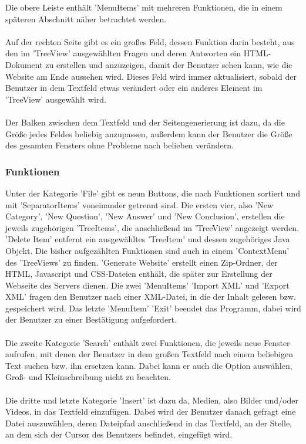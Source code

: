 Die obere Leiste enthält 'MenuItems' mit mehreren Funktionen, die in einem späteren Abschnitt näher betrachtet werden.
\\
\\
Auf der rechten Seite gibt es ein großes Feld, dessen Funktion darin besteht, aus den im 'TreeView' ausgewählten Fragen und deren Antworten ein HTML-Dokument zu erstellen und anzuzeigen, damit der Benutzer sehen kann, wie die Website am Ende aussehen wird. Dieses Feld wird immer aktualisiert, sobald der Benutzer in dem Textfeld etwas verändert oder ein anderes Element im 'TreeView' ausgewählt wird.
\\
\\
Der Balken zwischen dem Textfeld und der Seitengenerierung ist dazu, da die Größe jedes Feldes beliebig anzupassen, außerdem kann der Benutzer die Größe des gesamten Fensters ohne Probleme nach belieben verändern.

\subsubsection*{Funktionen}
Unter der Kategorie 'File' gibt es neun Buttons, die nach Funktionen sortiert und mit 'SeparatorItems' voneinander getrennt sind. Die ersten vier, also 'New Category', 'New Question', 'New Answer' und 'New Conclusion', erstellen die jeweils zugehörigen 'TreeItems', die anschließend im 'TreeView' angezeigt werden. 'Delete Item' entfernt ein ausgewähltes 'TreeItem' und dessen zugehöriges Java Objekt. Die bisher aufgezählten Funktionen sind auch in einem 'ContextMenu' des 'TreeViews' zu finden. 'Generate Website' erstellt einen Zip-Ordner, der HTML, Javascript und CSS-Dateien enthält, die später zur Erstellung der Webseite des Servers dienen. Die zwei 'MenuItems' 'Import XML' und 'Export XML' fragen den Benutzer nach einer XML-Datei, in die der Inhalt gelesen bzw. gespeichert wird. Das letzte 'MenuItem' 'Exit'  beendet das Programm, dabei wird der Benutzer zu einer Bestätigung aufgefordert.
\\
\\
Die zweite Kategorie 'Search' enthält zwei Funktionen, die jeweils neue Fenster aufrufen, mit denen der Benutzer in dem großen Textfeld nach einem beliebigen Text suchen bzw. ihn ersetzen kann. Dabei kann er auch die Option auswählen, Groß- und Kleinschreibung nicht zu beachten. 
\\
\\
Die dritte und letzte Kategorie 'Insert' ist dazu da, Medien, also Bilder und/oder Videos, in das Textfeld einzufügen. Dabei wird der Benutzer danach gefragt eine Datei auszuwählen, deren Dateipfad anschließend in das Textfeld, an der Stelle, an dem sich der Cursor des Benutzers befindet, eingefügt wird. 
\\
\\
